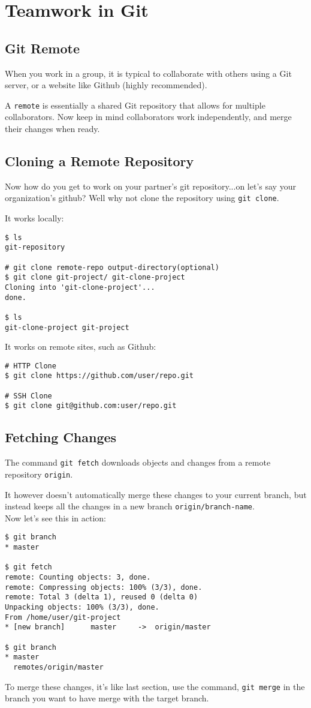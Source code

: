 \chapter{Teamwork in Git}
\section{Git Remote}

When you work in a group, it is typical to collaborate with others using a Git server, or a website like Github (highly recommended).

A \verb!remote! is essentially a shared Git repository that allows for multiple collaborators.
Now keep in mind collaborators work independently, and merge their changes when ready. 

\section{Cloning a Remote Repository}
Now how do you get to work on your partner's git repository...on let's say your organization's github? Well why not clone the repository using \verb!git clone!.

It works locally:
\begin{verbatim}
$ ls
git-repository

# git clone remote-repo output-directory(optional)    
$ git clone git-project/ git-clone-project 
Cloning into 'git-clone-project'...
done. 
    
$ ls
git-clone-project git-project
\end{verbatim}
It works on remote sites, such as Github:
\begin{verbatim}
# HTTP Clone
$ git clone https://github.com/user/repo.git

# SSH Clone
$ git clone git@github.com:user/repo.git
\end{verbatim}

\section{Fetching Changes}
The command \verb!git fetch! downloads objects and changes from a remote repository \verb!origin!.

It however doesn't automatically merge these changes to your current branch, but instead keeps all the changes in a new branch \verb!origin/branch-name!.
\\
Now let's see this in action: 
\begin{verbatim}
$ git branch
* master

$ git fetch
remote: Counting objects: 3, done. 
remote: Compressing objects: 100% (3/3), done. 
remote: Total 3 (delta 1), reused 0 (delta 0)
Unpacking objects: 100% (3/3), done. 
From /home/user/git-project 
* [new branch]      master     ->  origin/master

$ git branch
* master
  remotes/origin/master
\end{verbatim}
To merge these changes, it's like last section, use the command, \verb!git merge! in the branch you want to have merge with the target branch.

